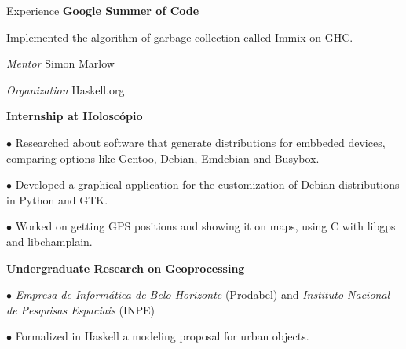 \begin {rubric} {Experience}
\entry* [05/2012-08/2010]
\textbf{Google Summer of Code}

Implemented the algorithm of garbage collection called Immix on GHC.

\textit{Mentor} Simon Marlow

\textit{Organization} Haskell.org

\entry* [10/2008-08/2009]
\textbf {Internship at Holoscópio}

$\bullet$ Researched about software that generate distributions for embbeded
devices, comparing options like Gentoo, Debian, Emdebian and Busybox.

$\bullet$ Developed a graphical application for the customization of Debian
distributions in Python and GTK.

$\bullet$ Worked on getting GPS positions and showing it on maps, using C with libgps and libchamplain.

\entry* [08/2004-10/2007]
\textbf {Undergraduate Research on Geoprocessing}

$\bullet$ \emph{Empresa de Informática de Belo
    Horizonte} (Prodabel) and \emph{Instituto Nacional
  de Pesquisas Espaciais} (INPE)

$\bullet$ Formalized in Haskell a modeling proposal for urban objects.

\end {rubric}
